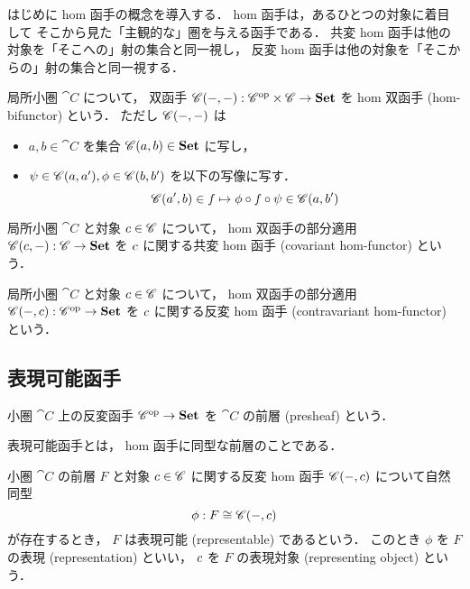 \documentclass[titlepage]{ltjsreport}
\begin{document}
はじめに hom 函手の概念を導入する．
hom 函手は，あるひとつの対象に着目して
そこから見た「主観的な」圏を与える函手である．
共変 hom 函手は他の対象を「そこへの」射の集合と同一視し，
反変 hom 函手は他の対象を「そこからの」射の集合と同一視する．
\begin{definition}
  \def\C{\cat{C}}%
  局所小圏 $\C$ について，
  双函手 $\mrp{\C(-,-)}{\op{\C}\times\C}{\set}$
  を hom 双函手 (hom-bifunctor) という．
  ただし $\mrps{\C}{-}{-}$ は
  \begin{itemize}
    \item $a,b\in\C$ を集合 $\mrps{\C}{a}{b}\in\set$ に写し，
    \item $\psi\in\mrps{\C}{a}{a'},\phi\in\mrps{\C}{b}{b'}$
          を以下の写像に写す．
          \begin{equation}
            \mrps{\C}{a'}{b}\in f\mapsto\phi\circ f\circ\psi\in\mrps{\C}{a}{b'}
          \end{equation}
  \end{itemize}
\end{definition}
\begin{definition}[共変 hom 函手]\label{def:covariant-hom-functor}
  \def\C{\cat{C}}%
  \def\c{\obj{c}}%
  局所小圏 $\C$ と対象 $\c\in\objs{\C}$ について，
  hom 双函手の部分適用 $\mrp{\mrps{\C}{\c}{-}}{\C}{\set}$ を
  $\c$ に関する共変 hom 函手 (covariant hom-functor) という．
\end{definition}
\begin{definition}[反変 hom 函手]
  \def\C{\cat{C}}%
  \def\c{\obj{c}}%
  局所小圏 $\C$ と対象 $\c\in\objs{\C}$ について，
  hom 双函手の部分適用 $\mrp{\mrps{\C}{-}{\c}}{\op{\C}}{\set}$ を
  $\c$ に関する反変 hom 函手 (contravariant hom-functor) という．
\end{definition}

\subsection{表現可能函手}

\begin{definition}[前層]
  \def\C{\cat{C}}%
  小圏 $\C$ 上の反変函手 $\op{\C}\to\set$ を
  $\C$ の前層 (presheaf) という．
\end{definition}

表現可能函手とは，
hom 函手に同型な前層のことである．

\begin{definition}[表現可能函手]
  \def\C{\cat{C}}%
  \def\c{\obj{c}}%
  \def\F{F}%
  \def\iso{\phi}%
  小圏 $\C$ の前層 $\F$ と対象 $\c\in\objs{\C}$
  に関する反変 hom 函手 $\mrps{\C}{-}{\c}$ について自然同型
  \begin{equation}
    \iso:\F\cong\mrps{\C}{-}{\c}
  \end{equation}
  が存在するとき，
  $\F$ は表現可能 (representable) であるという．
  このとき $\iso$ を $\F$ の表現 (representation) といい，
  $\c$ を $\F$ の表現対象 (representing object) という．
\end{definition}
\end{document}
